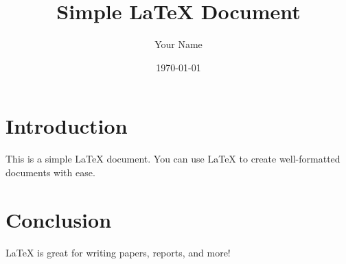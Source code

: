 \documentclass{article}
\begin{document}
\title{Simple LaTeX Document}
\author{Your Name}
\date{\today}

\maketitle

\section{Introduction}
This is a simple LaTeX document. You can use LaTeX to create well-formatted documents with ease.

\section{Conclusion}
LaTeX is great for writing papers, reports, and more!
\end{document}
